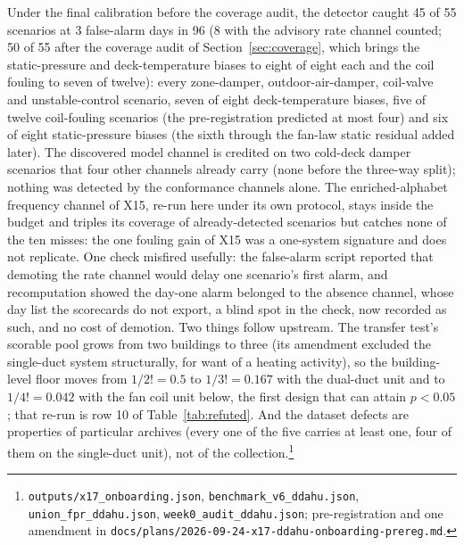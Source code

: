 \documentclass[11pt,letterpaper]{article}
\begin{document}
Under the final calibration before the coverage audit, the detector caught 45 of 55 scenarios at 3 false-alarm days in 96 (8 with the advisory rate channel counted; 50 of 55 after the coverage audit of Section~\ref{sec:coverage}, which brings the static-pressure and deck-temperature biases to eight of eight each and the coil fouling to seven of twelve): every zone-damper, outdoor-air-damper, coil-valve and unstable-control scenario, seven of eight deck-temperature biases, five of twelve coil-fouling scenarios (the pre-registration predicted at most four) and six of eight static-pressure biases (the sixth through the fan-law static residual added later). The discovered model channel is credited on two cold-deck damper scenarios that four other channels already carry (none before the three-way split); nothing was detected by the conformance channels alone. The enriched-alphabet frequency channel of X15, re-run here under its own protocol, stays inside the budget and triples its coverage of already-detected scenarios but catches none of the ten misses: the one fouling gain of X15 was a one-system signature and does not replicate. One check misfired usefully: the false-alarm script reported that demoting the rate channel would delay one scenario's first alarm, and recomputation showed the day-one alarm belonged to the absence channel, whose day list the scorecards do not export, a blind spot in the check, now recorded as such, and no cost of demotion. Two things follow upstream. The transfer test's scorable pool grows from two buildings to three (its amendment excluded the single-duct system structurally, for want of a heating activity), so the building-level floor moves from $1/2! = 0.5$ to $1/3! = 0.167$ with the dual-duct unit and to $1/4! = 0.042$ with the fan coil unit below, the first design that can attain $p<0.05$; that re-run is row 10 of Table~\ref{tab:refuted}. And the dataset defects are properties of particular archives (every one of the five carries at least one, four of them on the single-duct unit), not of the collection.\footnote{\texttt{outputs/x17\_onboarding.json}, \texttt{benchmark\_v6\_ddahu.json}, \texttt{union\_fpr\_ddahu.json}, \texttt{week0\_audit\_ddahu.json}; pre-registration and one amendment in \texttt{docs/plans/2026-09-24-x17-ddahu-onboarding-prereg.md}.}
\end{document}
